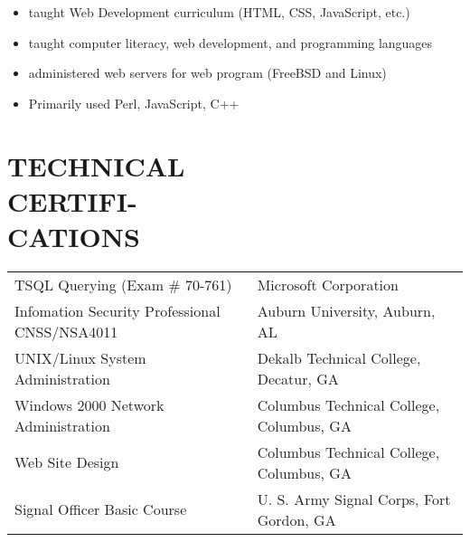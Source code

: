 \documentclass[margin, 10pt]{res} %
\begin{document}
\begin{resume}
\begin{itemize} \itemsep -2pt %
        \item taught Web Development curriculum (HTML, CSS, JavaScript, etc.)
\item taught computer literacy, web development, and programming languages
\item administered web servers for web program (FreeBSD and Linux)
\item Primarily used Perl, JavaScript, C++
\end{itemize}


\section{TECHNICAL\\CERTIFI-\\CATIONS\\
}

\small
    \begin{tabular}{l l }
        TSQL Querying (Exam \# 70-761) & Microsoft Corporation\\
        Infomation Security Professional CNSS/NSA4011  & Auburn University, Auburn, AL\\
        UNIX/Linux System Administration  & Dekalb Technical College,  Decatur, GA\\
        Windows 2000 Network Administration  & Columbus Technical College, Columbus, GA\\
        Web Site Design  & Columbus Technical College, Columbus, GA\\
        Signal Officer Basic Course  & U. S. Army Signal Corps,  Fort Gordon, GA\\
    \end{tabular}
    \normalsize
%
%
%
%
%
%


\end{resume}
\end{document}
